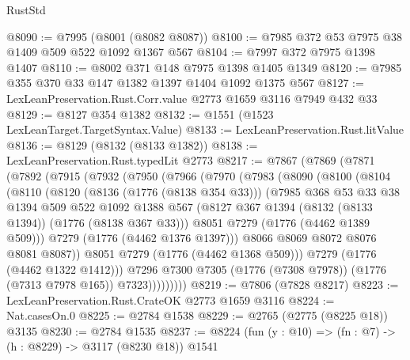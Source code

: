 \begin{lexlean}{RustStd}
\begin{coremodule}
@8090 := @7995 (@8001 (@8082 @8087))
@8100 := @7985 @372 @53 @7975 @38 @1409 @509 @522 @1092 @1367 @567
@8104 := @7997 @372 @7975 @1398 @1407
@8110 := @8002 @371 @148 @7975 @1398 @1405 @1349
@8120 := @7985 @355 @370 @33 @147 @1382 @1397 @1404 @1092 @1375 @567
@8127 := LexLeanPreservation.Rust.Corr.value @2773 @1659 @3116 @7949 @432 @33
@8129 := @8127 @354 @1382
@8132 := @1551 (@1523 LexLeanTarget.TargetSyntax.Value)
@8133 := LexLeanPreservation.Rust.litValue
@8136 := @8129 (@8132 (@8133 @1382))
@8138 := LexLeanPreservation.Rust.typedLit @2773
@8217 := @7867
    (@7869
      (@7871
        (@7892
          (@7915
            (@7932
              (@7950
                (@7966
                  (@7970
                    (@7983
                      (@8090
                        (@8100
                          (@8104
                            (@8110
                              (@8120
                                (@8136 (@1776 (@8138 @354 @33)))
                                (@7985
                                  @368
                                  @53
                                  @33
                                  @38
                                  @1394
                                  @509
                                  @522
                                  @1092
                                  @1388
                                  @567
                                  (@8127 @367 @1394 (@8132 (@8133 @1394)) (@1776 (@8138 @367 @33)))
                                  @8051
                                  @7279
                                  (@1776 (@4462 @1389 @509)))
                                @7279
                                (@1776 (@4462 @1376 @1397)))
                              @8066
                              @8069
                              @8072
                              @8076
                              @8081
                              @8087))
                          @8051
                          @7279
                          (@1776 (@4462 @1368 @509)))
                        @7279
                        (@1776 (@4462 @1322 @1412)))
                      @7296
                      @7300
                      @7305
                      (@1776 (@7308 @7978))
                      (@1776 (@7313 @7978 @165))
                      @7323)))))))))
@8219 := @7806 (@7828 @8217)
@8223 := LexLeanPreservation.Rust.CrateOK @2773 @1659 @3116
@8224 := Nat.casesOn.{0}
@8225 := @2784 @1538
@8229 := @2765 (@2775 (@8225 @18)) @3135
@8230 := @2784 @1535
@8237 := @8224 (fun (y : @10) => (fn : @7) -> (h : @8229) -> @3117 (@8230 @18)) @1541

\end{coremodule}
\end{lexlean}
